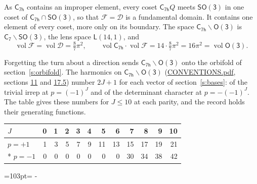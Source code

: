 \documentclass[10pt,a4paper]{article}
\newcommand{\needspace}[1]{\par\penalty-100\begingroup\dimen0=#1\relax\dimen2=\pagegoal
  \advance\dimen2-\pagetotal\ifdim\dimen0>\dimen2\relax\ifdim\dimen2>0pt\vfil\break\fi\fi
  \endgroup}
\numberwithin{equation}{section}
\newcommand{\grp}[1]{\mathsf{#1}}
\newcommand{\vol}{\operatorname{vol}}
\newcommand{\fcell}{\mathcal{D}}
\newcommand{\fdomain}{\mathcal{F}}
\newcommand{\lensspace}[2]{\mathsf{L}(#1, #2)}
\begin{document}
\leavevmode\label{n:set.fundamental}As $\grp{C_{7h}}$ contains an improper element, every coset $\grp{C_{7h}}Q$ meets \href{SO3.pdf}{$\grp{SO(3)}$} in one coset of $\grp{C_{7h}} \cap \grp{SO(3)}$, so that $\fdomain = \fcell$ is a fundamental domain. It contains one element of every coset, more only on its boundary.
\leavevmode\label{n:set.lens}The space $\grp{C_{7h}}\backslash\grp{O(3)}$ is $\grp{C_{7}}\backslash\grp{SO(3)}$, the lens space $\lensspace{14}{1}$, and
\begin{equation}\label{e:volume}\vol\fdomain = \vol\fcell = \tfrac{8}{7}\pi^2,\qquad \vol\grp{C_{7h}}\cdot\vol\fdomain = 14\cdot \tfrac{8}{7}\pi^2 = 16\pi^2 = \vol\grp{O(3)}.\end{equation}

Forgetting the turn about a direction sends $\grp{C_{7h}}\backslash\grp{O(3)}$ onto the orbifold of section~\ref{s:orbifold}.
The harmonics on $\grp{C_{7h}}\backslash\grp{O(3)}$ (\href{../../CONVENTIONS.pdf}{CONVENTIONS.pdf}, sections \href{../../CONVENTIONS.pdf\#conv.11}{11} and \href{../../CONVENTIONS.pdf\#conv.17.5}{17.5}) number $2J + 1$ for each vector of section~\ref{s:bases}: of the trivial irrep at $p = (-1)^J$ and of the determinant character at $p = -(-1)^J$. The table gives these numbers for $J \le 10$ at each parity, and the record holds their generating functions.
{\small\setlength{\tabcolsep}{4pt}\begin{longtable}{@{}lrrrrrrrrrrr@{}}\toprule
$J$ & 0 & 1 & 2 & 3 & 4 & 5 & 6 & 7 & 8 & 9 & 10\\\midrule\endhead
\bottomrule\endfoot\endlastfoot
$p = +1$ & 1 & 3 & 5 & 7 & 9 & 11 & 13 & 15 & 17 & 19 & 21\\*
$p = -1$ & 0 & 0 & 0 & 0 & 0 & 0 & 0 & 30 & 34 & 38 & 42\\
\bottomrule\end{longtable}}
\needspace{103pt}
\end{document}
